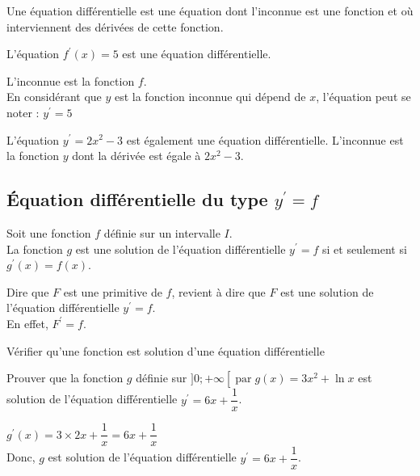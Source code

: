 \begin{bdefi}
	Une équation différentielle est une équation dont l'inconnue est une fonction et où interviennent des dérivées de cette fonction.
\end{bdefi}	

\begin{bexemple}
	\begin{itemDef}
		\item L'équation $f^{\prime}(x)=5$ est une équation différentielle.
		
		L'inconnue est la fonction $f$.\\
		En considérant que $y$ est la fonction inconnue qui dépend de $x$, l'équation peut se noter : $y^{\prime}=5$
		\item L'équation $y^{\prime}=2 x^{2}-3$ est également une équation différentielle.
		L'inconnue est la fonction $y$ dont la dérivée est égale à $2 x^{2}-3$.
	\end{itemDef}	
\end{bexemple}

\subsection{Équation différentielle du type $y^{\prime}=f$}

\begin{bdefi}
	Soit une fonction $f$ définie sur un intervalle $I$.\\
	La fonction $g$ est une solution de l'équation différentielle $y^{\prime}=f$ si et seulement si $g^{\prime}(x)=f(x)$.
\end{bdefi}

\begin{bprop}
	Dire que $F$ est une primitive de $f$, revient à dire que $F$ est une solution de l'équation différentielle $y^{\prime}=f$.\\
	En effet, $F^{\prime}=f$.
\end{bprop}

\begin{bmethodet}{Vérifier qu'une fonction est solution d'une équation différentielle}
	
	Prouver que la fonction $g$ définie sur $] 0 ;+\infty\left[\operatorname{par} g(x)=3 x^{2}+\ln x\right.$ est solution de l'équation différentielle $y^{\prime}=6 x+\dfrac{1}{x}$.
	
	
	$g^{\prime}(x)=3 \times 2 x+\dfrac{1}{x}=6 x+\dfrac{1}{x}$\\
	Donc, $g$ est solution de l'équation différentielle $y^{\prime}=6 x+\dfrac{1}{x}$.
\end{bmethodet}

